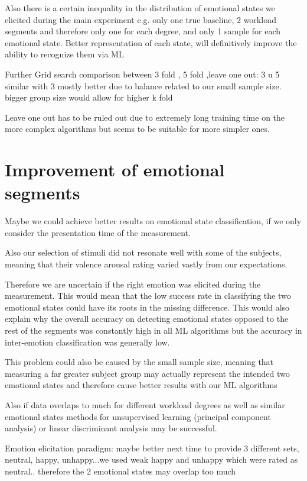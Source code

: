 Also there is a certain inequality in the distribution of emotional states we elicited during the main experiment e.g. only one true baseline, 2 workload segments and therefore only one for each degree, and only 1 sample for each emotional state. Better representation of each state, will definitively improve the ability to recognize them via ML  

Further Grid search comparison between 3 fold , 5 fold ,leave one out:
3 u 5 similar with 3 mostly better due to balance related to our small sample size. bigger group size would allow for higher k fold

Leave one out has to be ruled out due to extremely long training time on the more complex algorithms but seems to be suitable for more simpler ones.

\section{Improvement of emotional segments}
Maybe we could achieve better results on emotional state classification, if we only consider the presentation time of the measurement.

Also our selection of stimuli did not resonate well with some of the subjects, meaning that their valence arousal rating  varied vastly from our expectations.

Therefore  we are uncertain if the right emotion was elicited during the measurement. This would mean that the low success rate in classifying the two emotional states could have its roots in the missing difference. This would also explain why the overall accuracy on detecting emotional states opposed to the rest of the segments was constantly high in all ML algorithms but the accuracy in inter-emotion classification was generally low.

This problem could also be caused by the small sample size, meaning that measuring a far greater subject group may actually represent the intended two emotional states and therefore cause better results with our ML algorithms

Also if data overlaps to much for different workload degrees as well as similar emotional states methods for unsupervised learning (principal component analysis) or linear discriminant analysis may be successful.

Emotion elicitation paradigm: maybe better next time to provide 3 different sets, neutral, happy, unhappy...we used weak happy and unhappy which were rated as neutral.. therefore the 2 emotional states may overlap too much
